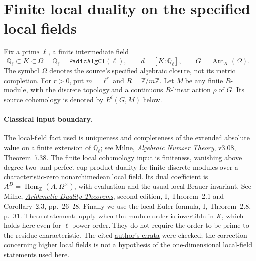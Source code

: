 \section{Finite local duality on the specified local fields}
\label{sec:local-k-duality}


Fix a prime $\ell$, a finite intermediate field
\[
 \mathbb Q_\ell\subset K\subset\Omega=\overline{\mathbb Q}_\ell
       =\texttt{PadicAlgCl}(\ell),\qquad
 d=[K:\mathbb Q_\ell],\qquad G=\operatorname{Aut}_K(\Omega).
 \tag{LK.1}
\]
The symbol $\Omega$ denotes the source's specified algebraic closure,
not its metric completion.  For $r>0$, put
$m=\ell^r$ and $R=\mathbb Z/m\mathbb Z$.
Let $M$ be any finite $R$-module, with the discrete topology and a
continuous $R$-linear action $\rho$ of $G$.  Its source cohomology is
denoted by $H^i(G,M)$ below.

\paragraph{Classical input boundary.}
The local-field fact used is uniqueness and completeness of the
extended absolute value on a finite extension of $\mathbb Q_\ell$;
see Milne, \emph{Algebraic Number Theory}, v3.08,
\href{https://www.jmilne.org/math/CourseNotes/ANT.pdf}{Theorem~7.38}.
The finite local cohomology input is finiteness, vanishing above degree
two, and perfect cup-product duality for finite discrete modules over
a characteristic-zero nonarchimedean local field.  Its dual coefficient
is $A^D=\operatorname{Hom}_{\mathbb Z}(A,\Omega^\times)$, with evaluation
and the usual local Brauer invariant.  See Milne,
\href{https://jmilne.org/math/Books/ADTnot.pdf}{\emph{Arithmetic Duality
Theorems}}, second edition, I, Theorem~2.1 and Corollary~2.3,
pp.~26--28.  Finally we use the local Euler formula, I, Theorem~2.8,
p.~31.  These statements apply when the module order is invertible in
$K$, which holds here even for $\ell$-power order.  They do not require
the order to be prime to the residue characteristic.  The cited
\href{https://www.jmilne.org/math/Books/add/ADT2006.pdf}{author's errata}
were checked; the correction concerning higher local fields is not a
hypothesis of the one-dimensional local-field statements used here.

